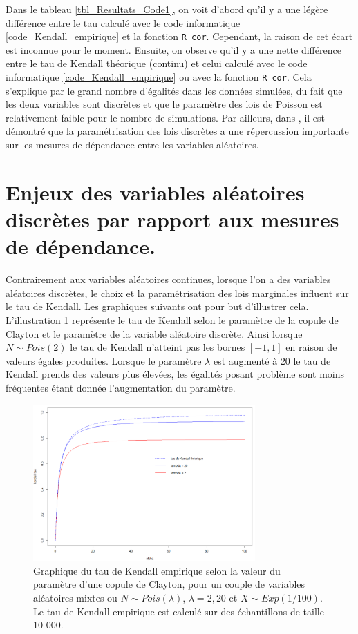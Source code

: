 \documentclass{article}
\begin{document}
	Dans le tableau \ref{tbl_Resultats_Code1}, on voit d'abord qu'il y a une légère différence entre le tau calculé avec le code informatique \ref{code_Kendall_empirique} et la fonction \texttt{R cor}. Cependant, la raison de cet écart est inconnue pour le moment. Ensuite, on observe qu'il y a une nette différence entre le tau de Kendall théorique (continu) et celui calculé avec le code informatique \ref{code_Kendall_empirique} ou avec la fonction \texttt{R cor}. Cela s'explique par le grand nombre d'égalités dans les données simulées, du fait que les deux variables sont discrètes et que le paramètre des lois de Poisson est relativement faible pour le nombre de simulations. Par ailleurs, dans \cite{Nikoloulopoulos_Kendall_discret}, il est démontré que la paramétrisation des lois discrètes a une répercussion importante sur les mesures de dépendance entre les variables aléatoires.\\
 	
 	
 	\section{Enjeux des variables aléatoires discrètes par rapport aux mesures de dépendance.}
  
	 Contrairement aux variables aléatoires continues, lorsque l'on a des variables aléatoires discrètes, le choix et la paramétrisation des lois marginales influent sur le tau de Kendall. Les graphiques suivants ont pour but d'illustrer cela. L'illustration \ref{graph_clayton} représente le tau de Kendall selon le paramètre de la copule de Clayton et le paramètre de la variable aléatoire discrète.  Ainsi lorsque $N\sim Pois(2)$ le tau de Kendall n'atteint pas les bornes $[-1,1]$ en raison de valeurs égales produites. Lorsque le paramètre $\lambda$ est augmenté à 20 le tau de Kendall prends des valeurs plus élevées, les égalités posant problème sont moins fréquentes étant donnée l'augmentation du paramètre. \\
	 
	 \begin{figure}[H]
	 	\centering
	 	\includegraphics[height=6cm]{Graph/clayton.png}
	 	\caption[Copule de Clayton]{Graphique du tau de Kendall empirique selon la valeur du paramètre d'une copule de Clayton, pour un couple de variables aléatoires mixtes ou $N\sim Pois(\lambda)$, $\lambda = 2,20$ et $X \sim Exp(1/100)$. Le tau de Kendall empirique est calculé sur des échantillons de taille 10 000.} 
	 	\label{graph_clayton}
	 \end{figure}
 
\end{document}
